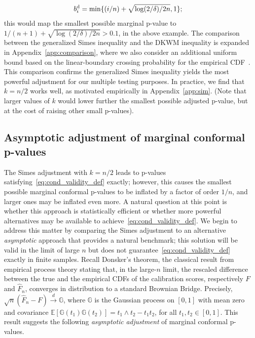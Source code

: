 \documentclass[11pt]{article}
\def\dkwm{\textnormal{d}}
\begin{document}
\begin{equation}\label{eq:bi_dkwm}
b_i^\dkwm = \min\{(i / n) + \sqrt{\log(2 / \delta) / 2n}, 1\};
\end{equation}
this would map the smallest possible marginal p-value to $1 / (n + 1) + \sqrt{\log(2 / \delta) / 2n} > 0.1$, in the above example.
The comparison between the generalized Simes inequality and the DKWM inequality is expanded in Appendix~\ref{app:comparison}, where we also consider an additional uniform bound based on the linear-boundary crossing probability for the empirical CDF~\citep{dempster1959generalized}.
This comparison confirms the generalized Simes inequality yields the most powerful adjustment for our multiple testing purposes.
In practice, we {find that $k = n/2$ works well}, as motivated empirically in Appendix~\ref{app:sim}.
(Note that larger values of $k$ would lower further the smallest possible adjusted p-value, but at the cost of raising other small p-values).

\subsection{Asymptotic adjustment of marginal conformal p-values} \label{sec:gen-asymptotic}

The Simes adjustment with $k=n/2$ leads to p-values satisfying~\eqref{eq:cond_validity_def} exactly; however, this causes the smallest possible marginal conformal p-values to be inflated by a factor of order $1/n$, and larger ones may be inflated even more.
A natural question at this point is whether this approach is statistically efficient or whether more powerful alternatives may be available to achieve~\eqref{eq:cond_validity_def}.
We begin to address this matter by comparing the Simes adjustment to an alternative {\it asymptotic} approach that provides a natural benchmark; this solution will be valid in the limit of large $n$ but does not guarantee~\eqref{eq:cond_validity_def} exactly in finite samples.
Recall Donsker's theorem, the classical result from empirical process theory stating that, in the large-$n$ limit, the rescaled difference between the true and the empirical CDFs of the calibration scores, respectively $F$ and $\hat{F}_n$, converges in distribution to a standard Brownian Bridge. Precisely,
$\sqrt{n} (\hat{F}_n - F) \overset{d}{\rightarrow} \mathbb{G}$,
where $\mathbb{G}$ is the Gaussian process on $[0,1]$ with
mean zero and covariance $\mathbb{E}[\mathbb{G}(t_1)\mathbb{G}(t_2)] = t_1 \wedge t_2 - t_1 t_2$, for all $t_1, t_2 \in [0,1]$. 
This result suggests the following {\em asymptotic adjustment} of marginal conformal p-values. 
\end{document}
